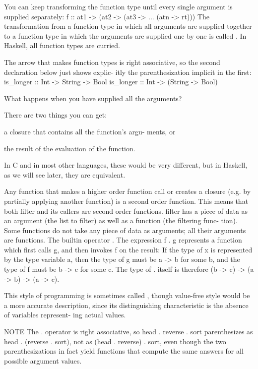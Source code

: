 You can keep transforming the function type until
every single argument is supplied separately:
f :: at1 -> (at2 -> (at3 -> ...
(atn -> rt)))
The transformation from a function type in which
all arguments are supplied together to a function
type in which the arguments are supplied one by
one is called .
In Haskell, all function types are curried. 

The
arrow that makes function types is right associative,
so the second declaration below just shows explic-
itly the parenthesization implicit in the first:
is_longer :: Int -> String -> Bool
is_longer :: Int -> (String -> Bool)

What happens
when you have supplied all the arguments?

There are two things you can get:
\begin{compactitem}
\item a closure that contains all the function’s argu-
ments, or
\item the result of the evaluation of the function.
\end{compactitem}
In C and in most other languages, these would be
very different, but in Haskell, as we will see later,
they are equivalent.

Any function that makes a higher order function
call or creates a closure (e.g. by partially applying
another function) is a second order function. This
means that both filter and its callers are second
order functions.
filter has a piece of data as an argument (the list
to filter) as well as a function (the filtering func-
tion). Some functions do not take any piece of data
as arguments; all their arguments are functions.
The builtin operator  .
The expression f . g represents a function which
first calls g, and then invokes f on the result:
If the type of x is represented by the type variable
a, then the type of g must be a -> b for some b,
and the type of f must be b -> c for some c. The
type of . itself is therefore (b -> c) -> (a -> b)
-> (a -> c).


This style of programming is sometimes called
, though value-free style would be a
more accurate description, since its distinguishing
characteristic is the absence of variables represent-
ing actual values.

NOTE The . operator is right associative, so
head . reverse . sort parenthesizes as head .
(reverse . sort), not as (head . reverse) .
sort, even though the two parenthesizations in fact
yield functions that compute the same answers for
all possible argument values.

